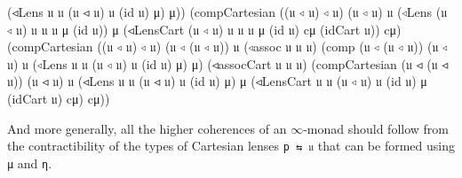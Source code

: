 \documentclass[
  11pt,
  oneside,
  article]{memoir}
\newenvironment{Shaded}{}{}
\newcommand{\NormalTok}[1]{#1}
\newcommand{\OtherTok}[1]{\textcolor[rgb]{0.00,0.44,0.13}{#1}}
\theoremstyle{definition}
\theoremstyle{plain}
\newcommand{\0}{\textsf{0}}
\newcommand{\1}{\tn{\textsf{1}}}
\begin{document}
\begin{Shaded}
\begin{Highlighting}[]
                    \OtherTok{(}\NormalTok{◃Lens 𝔲 𝔲 }\OtherTok{(}\NormalTok{𝔲 ◃ 𝔲}\OtherTok{)}\NormalTok{ 𝔲 }\OtherTok{(}\NormalTok{id 𝔲}\OtherTok{)}\NormalTok{ μ}\OtherTok{)}\NormalTok{ μ}\OtherTok{))} 
        \OtherTok{(}\NormalTok{compCartesian }\OtherTok{((}\NormalTok{𝔲 ◃ 𝔲}\OtherTok{)}\NormalTok{ ◃ 𝔲}\OtherTok{)} \OtherTok{(}\NormalTok{𝔲 ◃ 𝔲}\OtherTok{)}\NormalTok{ 𝔲 }
                       \OtherTok{(}\NormalTok{◃Lens }\OtherTok{(}\NormalTok{𝔲 ◃ 𝔲}\OtherTok{)}\NormalTok{ 𝔲 𝔲 𝔲 μ }\OtherTok{(}\NormalTok{id 𝔲}\OtherTok{))}\NormalTok{ μ }
                       \OtherTok{(}\NormalTok{◃LensCart }\OtherTok{(}\NormalTok{𝔲 ◃ 𝔲}\OtherTok{)}\NormalTok{ 𝔲 𝔲 𝔲 μ }\OtherTok{(}\NormalTok{id 𝔲}\OtherTok{)} 
\NormalTok{                                  cμ }\OtherTok{(}\NormalTok{idCart 𝔲}\OtherTok{))}\NormalTok{ cμ}\OtherTok{)}
        \OtherTok{(}\NormalTok{compCartesian }\OtherTok{((}\NormalTok{𝔲 ◃ 𝔲}\OtherTok{)}\NormalTok{ ◃ 𝔲}\OtherTok{)} \OtherTok{(}\NormalTok{𝔲 ◃ }\OtherTok{(}\NormalTok{𝔲 ◃ 𝔲}\OtherTok{))}\NormalTok{ 𝔲 }
                       \OtherTok{(}\NormalTok{◃assoc 𝔲 𝔲 𝔲}\OtherTok{)} 
                       \OtherTok{(}\NormalTok{comp }\OtherTok{(}\NormalTok{𝔲 ◃ }\OtherTok{(}\NormalTok{𝔲 ◃ 𝔲}\OtherTok{))} \OtherTok{(}\NormalTok{𝔲 ◃ 𝔲}\OtherTok{)}\NormalTok{ 𝔲 }
                             \OtherTok{(}\NormalTok{◃Lens 𝔲 𝔲 }\OtherTok{(}\NormalTok{𝔲 ◃ 𝔲}\OtherTok{)}\NormalTok{ 𝔲 }
                                    \OtherTok{(}\NormalTok{id 𝔲}\OtherTok{)}\NormalTok{ μ}\OtherTok{)}\NormalTok{ μ}\OtherTok{)} 
                       \OtherTok{(}\NormalTok{◃assocCart 𝔲 𝔲 𝔲}\OtherTok{)}
                       \OtherTok{(}\NormalTok{compCartesian }
                          \OtherTok{(}\NormalTok{𝔲 ◃ }\OtherTok{(}\NormalTok{𝔲 ◃ 𝔲}\OtherTok{))} \OtherTok{(}\NormalTok{𝔲 ◃ 𝔲}\OtherTok{)}\NormalTok{ 𝔲 }
                          \OtherTok{(}\NormalTok{◃Lens 𝔲 𝔲 }\OtherTok{(}\NormalTok{𝔲 ◃ 𝔲}\OtherTok{)}\NormalTok{ 𝔲 }\OtherTok{(}\NormalTok{id 𝔲}\OtherTok{)}\NormalTok{ μ}\OtherTok{)}\NormalTok{ μ }
                          \OtherTok{(}\NormalTok{◃LensCart 𝔲 𝔲 }\OtherTok{(}\NormalTok{𝔲 ◃ 𝔲}\OtherTok{)}\NormalTok{ 𝔲 }\OtherTok{(}\NormalTok{id 𝔲}\OtherTok{)}\NormalTok{ μ }
                                     \OtherTok{(}\NormalTok{idCart 𝔲}\OtherTok{)}\NormalTok{ cμ}\OtherTok{)}\NormalTok{ cμ}\OtherTok{))}
\end{Highlighting}
\end{Shaded}

And more generally, all the higher coherences of an \(\infty\)-monad
should follow from the contractibility of the types of Cartesian lenses
\texttt{p\ ⇆\ 𝔲} that can be formed using \texttt{μ} and \texttt{η}.
\end{document}

